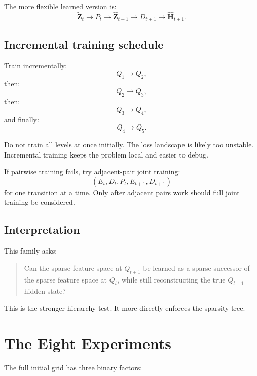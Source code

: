 \documentclass[11pt]{article}
\newcommand{\Hhat}{\widehat{\mathbf{H}}}
\newcommand{\Zhat}{\widehat{\mathbf{Z}}}
\newcommand{\Ztilde}{\widetilde{\mathbf{Z}}}
\begin{document}
The more flexible learned version is:
\[
\Ztilde_t
\rightarrow
P_t
\rightarrow
\Zhat_{t+1}
\rightarrow
D_{t+1}
\rightarrow
\Hhat_{t+1}.
\]

\subsection{Incremental training schedule}

Train incrementally:
\[
Q_1 \rightarrow Q_2,
\]
then:
\[
Q_2 \rightarrow Q_3,
\]
then:
\[
Q_3 \rightarrow Q_4,
\]
and finally:
\[
Q_4 \rightarrow Q_5.
\]

Do not train all levels at once initially. The loss landscape is likely too unstable. Incremental training keeps the problem local and easier to debug.

If pairwise training fails, try adjacent-pair joint training:
\[
(E_t,D_t,P_t,E_{t+1},D_{t+1})
\]
for one transition at a time. Only after adjacent pairs work should full joint training be considered.

\subsection{Interpretation}

This family asks:
\begin{quote}
Can the sparse feature space at \(Q_{t+1}\) be learned as a sparse successor of the sparse feature space at \(Q_t\), while still reconstructing the true \(Q_{t+1}\) hidden state?
\end{quote}

This is the stronger hierarchy test. It more directly enforces the sparsity tree.

\section{The Eight Experiments}

The full initial grid has three binary factors:
\end{document}
